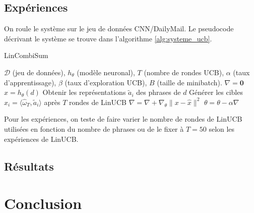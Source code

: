 \subsection{Expériences}

On roule le système sur le jeu de données CNN/DailyMail.
Le pseudocode décrivant le système se trouve dans l'algorithme \ref{alg:systeme_ucb}.

\begin{algorithm}
    \caption{LinCombiSum}
    \begin{algorithmic}[1]
        \Require  $\mathcal{D}$ (jeu de données), $h_\theta$ (modèle neuronal), $T$ (nombre de rondes UCB), $\alpha$ (taux d'apprentissage), $\beta$ (taux d'exploration UCB), $B$ (taille de minibatch).
         
        \State $\nabla = \mathbf{0}$
        \State $x = h_\theta(d)$
        \State Obtenir les représentations $\tilde{a}_i$ des phrases de $d$
        \State Générer les cibles $\hat{x}_i = \langle \hat{\omega}_T, \tilde{a}_i \rangle$ après $T$ rondes de LinUCB
        \State $\nabla = \nabla + \nabla_\theta \lVert x - \hat{x} \rVert^2$
        \EndFor
        \State $\theta = \theta - \alpha \nabla$
        \EndWhile
    \end{algorithmic}
    \label{alg:systeme_ucb}
\end{algorithm}

Pour les expériences, on teste de faire varier le nombre de rondes de LinUCB utilisées en fonction 
du nombre de phrases ou de le fixer à $T=50$ selon les expériences de LinUCB.

\subsection{Résultats}


\section{Conclusion}

